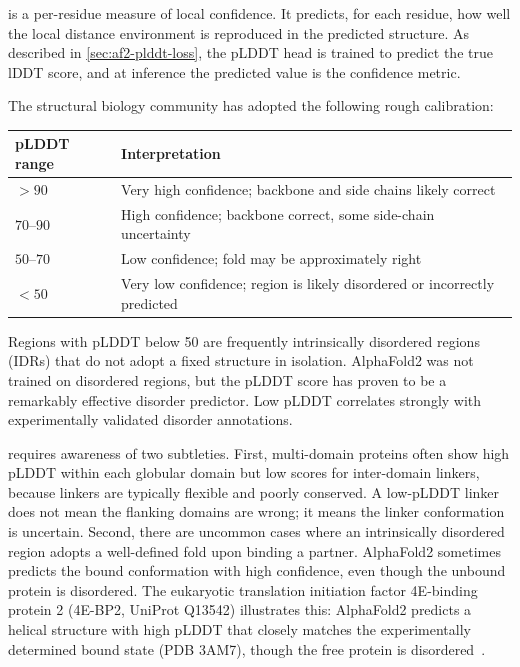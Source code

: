  is a per-residue measure of local confidence.
It predicts, for each residue, how well the local distance environment is reproduced in the predicted structure.
As described in \cref{sec:af2-plddt-loss}, the pLDDT head is trained to predict the true lDDT score, and at inference the predicted value is the confidence metric.

The structural biology community has adopted the following rough calibration:
\begin{center}
\begin{tabular}{@{}ll@{}}
\toprule
pLDDT range & Interpretation \\
\midrule
$> 90$ & Very high confidence; backbone and side chains likely correct \\
$70$--$90$ & High confidence; backbone correct, some side-chain uncertainty \\
$50$--$70$ & Low confidence; fold may be approximately right \\
$< 50$ & Very low confidence; region is likely disordered or incorrectly predicted \\
\bottomrule
\end{tabular}
\end{center}

Regions with pLDDT below 50 are frequently intrinsically disordered regions (IDRs) that do not adopt a fixed structure in isolation.
AlphaFold2 was not trained on disordered regions, but the pLDDT score has proven to be a remarkably effective disorder predictor.
Low pLDDT correlates strongly with experimentally validated disorder annotations.

 requires awareness of two subtleties.
First, multi-domain proteins often show high pLDDT within each globular domain but low scores for inter-domain linkers, because linkers are typically flexible and poorly conserved.
A low-pLDDT linker does not mean the flanking domains are wrong; it means the linker conformation is uncertain.
Second, there are uncommon cases where an intrinsically disordered region adopts a well-defined fold upon binding a partner.
AlphaFold2 sometimes predicts the bound conformation with high confidence, even though the unbound protein is disordered.
The eukaryotic translation initiation factor 4E-binding protein 2 (4E-BP2, UniProt Q13542) illustrates this: AlphaFold2 predicts a helical structure with high pLDDT that closely matches the experimentally determined bound state (PDB 3AM7), though the free protein is disordered~\cite{alderson2023,piovesan2022}.

